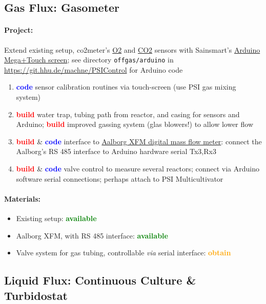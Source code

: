 \documentclass[12pt,a4paper]{scrartcl}
\newcommand{\obtain}[0]{\textcolor{orange}{\textbf{obtain}}}
\newcommand{\avail}[0]{\textcolor{green}{\textbf{available}}}
\newcommand{\build}[0]{\textcolor{red}{\textbf{build}}}
\newcommand{\code}[0]{\textcolor{blue}{\textbf{code}}}
\begin{document}
\subsection{Gas Flux: Gasometer}
\label{gas}
\paragraph{Project:} 
Extend existing setup, co2meter's
\href{http://www.co2meter.com/collections/co2-sensors/oxygen-sensors}{O2}
and
\href{http://www.co2meter.com/collections/co2-sensors/products/cozir-5-100-co2-sensor}{CO2}
sensors with Sainsmart's
\href{http://www.sainsmart.com/featured-products/sainsmart-mega2560-board-3-5-tft-lcd-module-display-shield-kit-for-atmel-atmega-avr-16au-atmega8u2.html}{Arduino
  Mega+Touch screen}; see directory \texttt{offgas/arduino} in
\url{https://git.hhu.de/machne/PSIControl} for Arduino code

\begin{enumerate}
\item \code{} sensor calibration routines via touch-screen (use PSI
  gas mixing system)
\item \build{} water trap, tubing path from reactor, and casing for
  sensors and Arduino; \build{} improved gassing system (glas
  blowers!) to allow lower flow
\item \build{} \& \code{} interface to \href{http://www.aalborg.com/index.php/main_page/product_overview/id_product_overview/63}{Aalborg XFM digital mass flow
  meter}: connect the Aalborg's RS 485 interface to Arduino hardware
  serial Tx3,Rx3
\item \build{} \& \code{} valve control to measure several reactors;
  connect via Arduino software serial connections; perhaps attach to
  PSI Multicultivator
\end{enumerate}

\paragraph{Materials:}

\begin{itemize}
\item Existing setup: \avail{}
\item Aalborg XFM, with RS 485 interface: \avail{}
\item Valve system for gas tubing, controllable \textit{via} serial
  interface: \obtain{}
\end{itemize}

\subsection{Liquid Flux: Continuous Culture \& Turbidostat} 
\label{cult}
\end{document}
